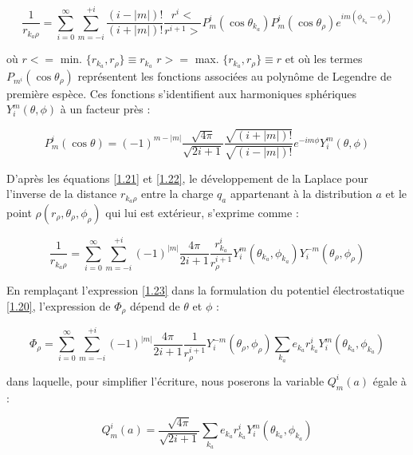 \begin{equation}
\frac{1}{r_{k_{a}\rho}} = \sum_{i=0}^{\infty} \sum_{m=-i}^{+i} \frac{(i-|m|)!}{(i+ |m|)!} \frac{r^{i}<}{r^{i+1}>} P_{m}^{i} (\cos\theta_{k_{a}}) P^{i}_{m}(\cos\theta_{\rho})e^{im(\phi_{k_{a}}- \phi_{\rho})} \label{1.21}
\end{equation}
	
où $r< =$ min. $\{r_{k_{a}}, r_{\rho}\} \equiv r_{k_{a}}$
$r> =$ max. $\{r_{k_{a}}, r_{\rho}\} \equiv r$
et où les termes $P_{m^{i}} (\cos\theta_{\rho})$ représentent les fonctions associées au polynôme de Legendre de première espèce. Ces fonctions s'identifient aux harmoniques sphériques $Y_{i}^{m}(\theta,\phi)$ à un facteur près : 
	
\begin{equation}
P_{m}^{i}(\cos\theta) = (-1)^{m-|m|} \frac{\sqrt{4\pi}}{\sqrt{2i+ 1}} \frac{\sqrt{(i+ |m|)!}}{\sqrt{(i-|m|)!}} e^{-im\phi} Y_{i}^{m}(\theta,\phi) \label{1.22}
\end{equation}
	
D'après les équations \ref{1.21} et \ref{1.22}, le développement de la Laplace pour l'inverse de la distance $r_{k_{a}\rho}$ entre la charge $q_{a}$ appartenant à la distribution $a$ et le point $\rho(r_{\rho}, \theta_{\rho}, \phi_{\rho})$ qui lui est extérieur, s'exprime comme : 
	
\begin{equation}
\frac{1}{r_{k_{a}\rho}} = \sum_{i=0}^{\infty} \sum_{m=-i}^{+i} (-1)^{|m|} \frac{4\pi}{2i +1} \frac{r_{k_{a}}^{i}}{r_{\rho}^{i+1}} Y^{m}_{i} (\theta_{k_{a}}, \phi_{k_{a}}) Y_{i}^{-m} (\theta_{\rho},\phi_{\rho})  \label{1.23}
\end{equation}
	
En remplaçant l'expression \ref{1.23} dans la formulation du potentiel électrostatique \ref{1.20}, l'expression de $\Phi_{\rho}$ dépend de $\theta$ et $\phi$ : 
	
\begin{equation}
\Phi_{\rho} = \sum_{i=0}^{\infty} \sum_{m=-i}^{+i} (-1)^{|m|}\frac{4\pi}{2i +1} \frac{1}{r_{\rho}^{i+1}} Y_{i}^{-m} (\theta_{\rho},\phi_{\rho}) \sum_{k_{a}} e_{k_{a}}r^{i}_{k_{a}} Y^{m}_{i} (\theta_{k_{a}}, \phi_{k_{a}})
\end{equation}
	
dans laquelle, pour simplifier l'écriture, nous poserons la variable $Q_{m}^{i}(a)$ égale à : 
	
\begin{equation}
Q_{m}^{i}(a)= \frac{\sqrt{4\pi}}{\sqrt{2i + 1}} \sum_{k_{a}} e_{k_{a}}r_{k_{a}}^{i} Y_{i}^{m} (\theta_{k_{a}}, \phi_{k_{a}}) \label{1.25}
\end{equation}
	
